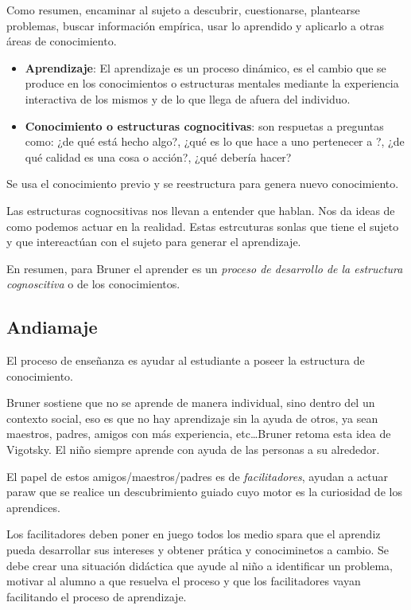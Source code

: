 \documentclass[12pt]{report}
\newcounter{it}
\theoremstyle{largebreak}
\begin{document}
    Como resumen, encaminar al sujeto a descubrir, cuestionarse, plantearse problemas, buscar información empírica, usar lo aprendido y aplicarlo a otras áreas de conocimiento.

    \begin{itemize}
        \item \textbf{Aprendizaje}: El aprendizaje es un proceso dinámico, es el cambio que se produce en los conocimientos o estructuras mentales mediante la experiencia interactiva de los mismos y de lo que llega de afuera del individuo.
        \item \textbf{Conocimiento o estructuras cognocitivas}: son respuetas a preguntas como: ¿de qué está hecho algo?, ¿qué es lo que hace a uno pertenecer a ?, ¿de qué calidad es una cosa o acción?, ¿qué debería hacer?
    \end{itemize}

    Se usa el conocimiento previo y se reestructura para genera nuevo conocimiento.

    Las estructuras cognocsitivas nos llevan a entender que hablan. Nos da ideas de como podemos actuar en la realidad. Estas estrcuturas sonlas que tiene el sujeto y que intereactúan con el sujeto para generar el aprendizaje.

    En resumen, para Bruner el aprender es un \textit{proceso de desarrollo de la estructura cognoscitiva} o de los conocimientos.

    \subsection{Andiamaje}

    El proceso de enseñanza es ayudar al estudiante a poseer la estructura de conocimiento.

    Bruner sostiene que no se aprende de manera individual, sino dentro del un contexto social, eso es que no hay aprendizaje sin la ayuda de otros, ya sean maestros, padres, amigos con más experiencia, etc\dots Bruner retoma esta idea de Vigotsky. El niño siempre aprende con ayuda de las personas a su alrededor.

    El papel de estos amigos/maestros/padres es de \textit{facilitadores}, ayudan a actuar paraw que se realice un descubrimiento guiado cuyo motor es la curiosidad de los aprendices.

    Los facilitadores deben poner en juego todos los medio spara que el aprendiz pueda desarrollar sus intereses y obtener prática y conociminetos a cambio. Se debe crear una situación didáctica que ayude al niño a identificar un problema, motivar al alumno a que resuelva el proceso y que los facilitadores vayan facilitando el proceso de aprendizaje.
\end{document}

